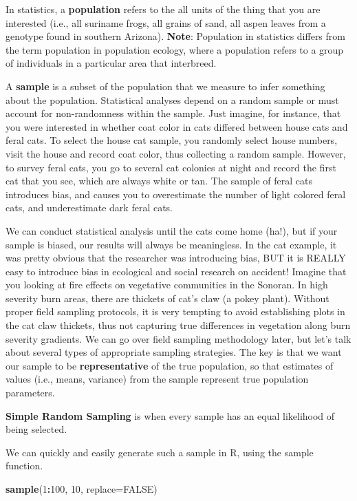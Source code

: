 \documentclass[
]{book}
\newenvironment{Shaded}{\begin{snugshade}}{\end{snugshade}}
\newcommand{\AttributeTok}[1]{\textcolor[rgb]{0.13,0.29,0.53}{#1}}
\newcommand{\ConstantTok}[1]{\textcolor[rgb]{0.56,0.35,0.01}{#1}}
\newcommand{\DecValTok}[1]{\textcolor[rgb]{0.00,0.00,0.81}{#1}}
\newcommand{\FunctionTok}[1]{\textcolor[rgb]{0.13,0.29,0.53}{\textbf{#1}}}
\newcommand{\NormalTok}[1]{#1}
\newcommand{\SpecialCharTok}[1]{\textcolor[rgb]{0.81,0.36,0.00}{\textbf{#1}}}
\begin{document}
In statistics, a \textbf{population} refers to the all units of the thing that you are interested (i.e., all suriname frogs, all grains of sand, all aspen leaves from a genotype found in southern Arizona). \textbf{Note}: Population in statistics differs from the term population in population ecology, where a population refers to a group of individuals in a particular area that interbreed.

A \textbf{sample} is a subset of the population that we measure to infer something about the population. Statistical analyses depend on a random sample or must account for non-randomness within the sample. Just imagine, for instance, that you were interested in whether coat color in cats differed between house cats and feral cats. To select the house cat sample, you randomly select house numbers, visit the house and record coat color, thus collecting a random sample. However, to survey feral cats, you go to several cat colonies at night and record the first cat that you see, which are always white or tan. The sample of feral cats introduces bias, and causes you to overestimate the number of light colored feral cats, and underestimate dark feral cats.

We can conduct statistical analysis until the cats come home (ha!), but if your sample is biased, our results will always be meaningless. In the cat example, it was pretty obvious that the researcher was introducing bias, BUT it is REALLY easy to introduce bias in ecological and social research on accident! Imagine that you looking at fire effects on vegetative communities in the Sonoran. In high severity burn areas, there are thickets of cat's claw (a pokey plant). Without proper field sampling protocols, it is very tempting to avoid establishing plots in the cat claw thickets, thus not capturing true differences in vegetation along burn severity gradients. We can go over field sampling methodology later, but let's talk about several types of appropriate sampling strategies. The key is that we want our sample to be \textbf{representative} of the true population, so that estimates of values (i.e., means, variance) from the sample represent true population parameters.

\textbf{Simple Random Sampling} is when every sample has an equal likelihood of being selected.

We can quickly and easily generate such a sample in R, using the sample function.

\begin{Shaded}
\begin{Highlighting}[]
\FunctionTok{sample}\NormalTok{(}\DecValTok{1}\SpecialCharTok{:}\DecValTok{100}\NormalTok{, }\DecValTok{10}\NormalTok{, }\AttributeTok{replace=}\ConstantTok{FALSE}\NormalTok{)}
\end{Highlighting}
\end{Shaded}
\end{document}
